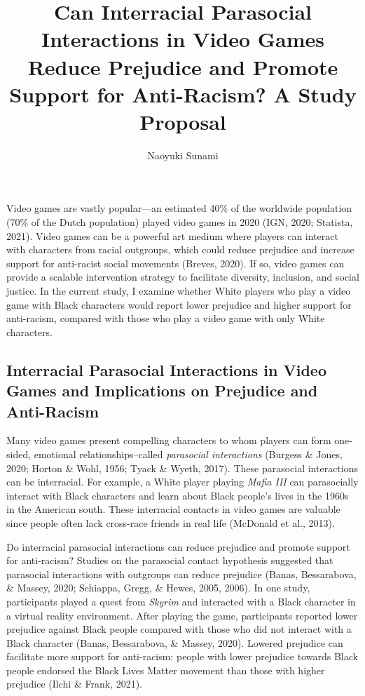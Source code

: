 \documentclass[
  english,
  man, noextraspace,floatsintext]{apa6}
\title{Can Interracial Parasocial Interactions in Video Games Reduce Prejudice and Promote Support for Anti-Racism? A Study Proposal}
\author{Naoyuki Sunami\textsuperscript{}}
\date{}
\affiliation{\phantom{0}}
\begin{document}
\maketitle

Video games are vastly popular---an estimated 40\% of the worldwide population (70\% of the Dutch population) played video games in 2020 (IGN, 2020; Statista, 2021). Video games can be a powerful art medium where players can interact with characters from racial outgroups, which could reduce prejudice and increase support for anti-racist social movements (Breves, 2020). If so, video games can provide a scalable intervention strategy to facilitate diversity, inclusion, and social justice. In the current study, I examine whether White players who play a video game with Black characters would report lower prejudice and higher support for anti-racism, compared with those who play a video game with only White characters.

\hypertarget{interracial-parasocial-interactions-in-video-games-and-implications-on-prejudice-and-anti-racism}{%
\subsection{Interracial Parasocial Interactions in Video Games and Implications on Prejudice and Anti-Racism}\label{interracial-parasocial-interactions-in-video-games-and-implications-on-prejudice-and-anti-racism}}

Many video games present compelling characters to whom players can form one-sided, emotional relationships--called \emph{parasocial interactions} (Burgess \& Jones, 2020; Horton \& Wohl, 1956; Tyack \& Wyeth, 2017). These parasocial interactions can be interracial. For example, a White player playing \emph{Mafia III} can parasocially interact with Black characters and learn about Black people's lives in the 1960s in the American south. These interracial contacts in video games are valuable since people often lack cross-race friends in real life (McDonald et al., 2013).

Do interracial parasocial interactions can reduce prejudice and promote support for anti-racism? Studies on the parasocial contact hypothesis suggested that parasocial interactions with outgroups can reduce prejudice (Banas, Bessarabova, \& Massey, 2020; Schiappa, Gregg, \& Hewes, 2005, 2006). In one study, participants played a quest from \emph{Skyrim} and interacted with a Black character in a virtual reality environment. After playing the game, participants reported lower prejudice against Black people compared with those who did not interact with a Black character (Banas, Bessarabova, \& Massey, 2020). Lowered prejudice can facilitate more support for anti-racism: people with lower prejudice towards Black people endorsed the Black Lives Matter movement than those with higher prejudice (Ilchi \& Frank, 2021).~
\end{document}
